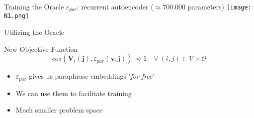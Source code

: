 \documentclass{beamer}
\begin{document}
\begin{frame}{Training the Oracle}
$\varepsilon_{par}$: \alert{recurrent autoencoder} ($\approx 700.000$ parameters)
\texttt{[image: N1.png]}
\end{frame}

\begin{frame}{Utilizing the Oracle}
\begin{block}{New Objective Function}
\[
cos(\pmb{V}_i(\pmb{j}), \varepsilon_{par}(\pmb{v},\pmb{j})) \rightsquigarrow 1
\quad \forall \ (i,j) \in \mathcal{V} \times \mathcal{O}
\]
\end{block}

\begin{itemize}
\item $\varepsilon_{par}$ gives us paraphrase embeddings '\textit{for free}'
\item We can use them to facilitate training
\item Much smaller problem space
\end{itemize}
\end{frame}
\end{document}
